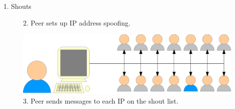 \documentclass[ %
                    author={Luke Murray},
                supervisor={Dr. Simon Hollis},
                     title={Shadow Peer-to-Peer Networks},
                  subtitle={},
                    degree={MEng},
                      year={2013} ]{poster}
\begin{document}
\begin{frame}{}
\begin{columns}[t]
\begin{column}{0.422\linewidth}
\begin{block}{\normalsize 1. Shouts}
\begin{figure}[h]
        \caption{2. Peer sets up IP address spoofing.}
    \end{figure}
    \begin{figure}[h]
        \includegraphics{diagrams/poster_d2.eps}
        \caption{3. Peer sends messages to each IP on the shout list.}
    \end{figure}
    \end{block}
    \end{column}


\end{columns}
\end{frame}
\end{document}

